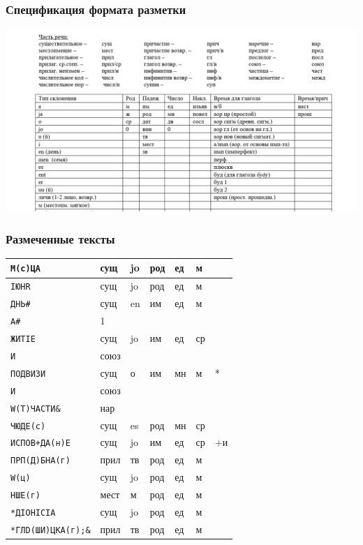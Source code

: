\documentclass[xetex, aspectratio=169, russian]{beamer}
\begin{document}
\begin{frame}
  \frametitle{Спецификация формата разметки}

  \begin{center}
    \includegraphics[width=0.9\linewidth]{spec}
  \end{center}
\end{frame}

\begin{frame}
  \frametitle{Размеченные тексты}

  \footnotesize \setlength{\aboverulesep}{0.5pt} \setlength{\belowrulesep}{0.5pt}
  \begin{tabularx}{\textwidth}{Xp{0.75cm}p{0.75cm}p{0.75cm}p{0.75cm}p{0.75cm}p{0.75cm}}
    \toprule
    \texttt{М(с)ЦА} & сущ  & jo & род & ед & м  &    \\ \midrule
    \texttt{IЮНR} & сущ  & jo & род & ед & м  &    \\ \midrule
    \texttt{ДНЬ\#} & сущ  & en & им  & ед & м  &    \\ \midrule
    \texttt{А\#} & 1    &    &     &    &    &    \\ \midrule
    \texttt{ЖИТIЕ} & сущ  & jo & им  & ед & ср &    \\ \midrule
    \texttt{И} & союз &    &     &    &    &    \\ \midrule
    \texttt{ПОДВИЗИ} & сущ  & о  & им  & мн & м  & *  \\ \midrule
    \texttt{И} & союз &    &     &    &    &    \\ \midrule
    \texttt{W(Т)ЧАСТИ\&} & нар  &    &     &    &    &    \\ \midrule
    \texttt{ЧЮДЕ(с)} & сущ  & es & род & мн & ср &    \\ \midrule
    \texttt{ИСПОВ+ДА(н)Е} & сущ  & jo & им  & ед & ср & +и \\ \midrule
    \texttt{ПРП(Д)БНА(г)} & прил & тв & род & ед & м  &    \\ \midrule
    \texttt{W(ц)} & сущ  & jo & род & ед & м  &    \\ \midrule
    \texttt{НШЕ(г)} & мест & м  & род & ед & м  &    \\ \midrule
    \texttt{*ДIОНIСIА} & сущ  & jo & род & ед & м  &    \\ \midrule
    \texttt{*ГЛD(ШИ)ЦКА(г);\&} & прил & тв & род & ед & м  &    \\ \bottomrule
  \end{tabularx}
\end{frame}
\end{document}
